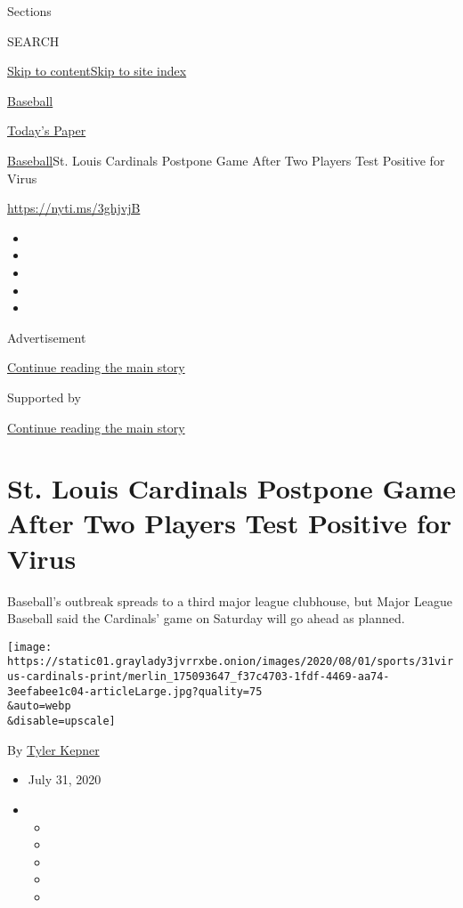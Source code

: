 Sections

SEARCH

\protect\hyperlink{site-content}{Skip to
content}\protect\hyperlink{site-index}{Skip to site index}

\href{https://www.nytimes3xbfgragh.onion/section/sports/baseball}{Baseball}

\href{https://myaccount.nytimes3xbfgragh.onion/auth/login?response_type=cookie\&client_id=vi}{}

\href{https://www.nytimes3xbfgragh.onion/section/todayspaper}{Today's
Paper}

\href{/section/sports/baseball}{Baseball}\textbar{}St. Louis Cardinals
Postpone Game After Two Players Test Positive for Virus

\url{https://nyti.ms/3ghjvjB}

\begin{itemize}
\item
\item
\item
\item
\item
\end{itemize}

Advertisement

\protect\hyperlink{after-top}{Continue reading the main story}

Supported by

\protect\hyperlink{after-sponsor}{Continue reading the main story}

\hypertarget{st-louis-cardinals-postpone-game-after-two-players-test-positive-for-virus}{%
\section{St. Louis Cardinals Postpone Game After Two Players Test
Positive for
Virus}\label{st-louis-cardinals-postpone-game-after-two-players-test-positive-for-virus}}

Baseball's outbreak spreads to a third major league clubhouse, but Major
League Baseball said the Cardinals' game on Saturday will go ahead as
planned.

\texttt{[image: https://static01.graylady3jvrrxbe.onion/images/2020/08/01/sports/31virus-cardinals-print/merlin\_175093647\_f37c4703-1fdf-4469-aa74-3eefabee1c04-articleLarge.jpg?quality=75\\\&auto=webp\\\&disable=upscale]}

By \href{https://www.nytimes3xbfgragh.onion/by/tyler-kepner}{Tyler
Kepner}

\begin{itemize}
\item
  July 31, 2020
\item
  \begin{itemize}
  \item
  \item
  \item
  \item
  \item
  \end{itemize}
\end{itemize}

